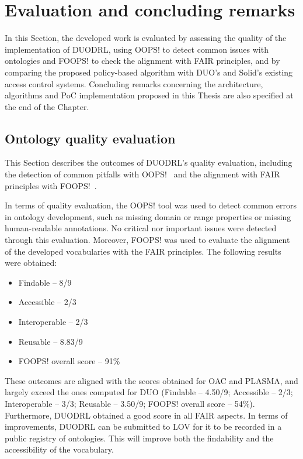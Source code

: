 \section{Evaluation and concluding remarks}
\label{sec:evaluation_conclusions}

In this Section, the developed work is evaluated by assessing the quality of the implementation of DUODRL, using OOPS! to detect common issues with ontologies and FOOPS! to check the alignment with FAIR principles, and by comparing the proposed policy-based algorithm with DUO's and Solid's existing access control systems.
Concluding remarks concerning the architecture, algorithms and PoC implementation proposed in this Thesis are also specified at the end of the Chapter.

\subsection{Ontology quality evaluation}
\label{sec:ontology_evaluation}

This Section describes the outcomes of DUODRL's quality evaluation, including the detection of common pitfalls with OOPS!~\citep{poveda-villalon_oops_2014} and the alignment with FAIR principles with FOOPS!~\citep{garijo_foops_2021}. 

In terms of quality evaluation, the OOPS! tool was used to detect common errors in ontology development, such as missing domain or range properties or missing human-readable annotations.
No critical nor important issues were detected through this evaluation.
Moreover, FOOPS! was used to evaluate the alignment of the developed vocabularies with the FAIR principles.
The following results were obtained:
\begin{itemize}
    \item Findable -- 8/9
    \item Accessible -- 2/3
    \item Interoperable -- 2/3
    \item Reusable -- 8.83/9
    \item FOOPS! overall score -- 91\%
\end{itemize}
These outcomes are aligned with the scores obtained for OAC and PLASMA, and largely exceed the ones computed for DUO (Findable -- 4.50/9; Accessible -- 2/3; Interoperable -- 3/3; Reusable -- 3.50/9; FOOPS! overall score -- 54\%).
Furthermore, DUODRL obtained a good score in all FAIR aspects.
In terms of improvements, DUODRL can be submitted to LOV for it to be recorded in a public registry of ontologies.
This will improve both the findability and the accessibility of the vocabulary.


